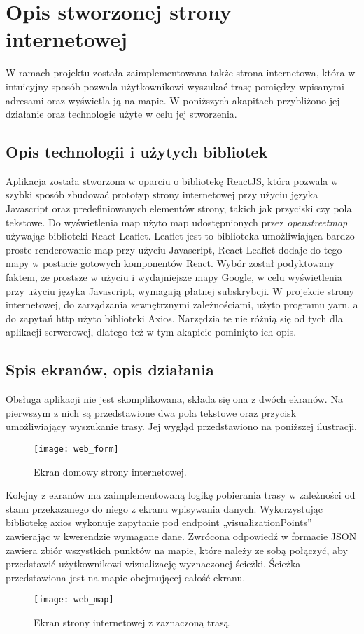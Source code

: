 \section{Opis stworzonej strony internetowej}

W ramach projektu została zaimplementowana także strona internetowa, która w intuicyjny sposób pozwala użytkownikowi wyszukać trasę pomiędzy wpisanymi adresami oraz wyświetla ją na mapie. W poniższych akapitach przybliżono jej działanie oraz technologie użyte w celu jej stworzenia.

\subsection{Opis technologii i użytych bibliotek}

Aplikacja została stworzona w oparciu o bibliotekę ReactJS, która pozwala w szybki sposób zbudować prototyp strony internetowej przy użyciu języka Javascript oraz predefiniowanych elementów strony, takich jak przyciski czy pola tekstowe. Do wyświetlenia map użyto map udostępnionych przez \textit{openstreetmap} używając biblioteki React Leaflet. Leaflet jest to biblioteka umożliwiająca bardzo proste renderowanie map przy użyciu Javascript, React Leaflet dodaje do tego mapy w postacie gotowych komponentów React. Wybór został podyktowany faktem, że prostsze w użyciu i wydajniejsze mapy Google, w celu wyświetlenia przy użyciu języka Javascript, wymagają płatnej subskrybcji.
W projekcie strony internetowej, do zarządzania zewnętrznymi zależnościami, użyto programu yarn, a do zapytań http użyto biblioteki Axios. Narzędzia te nie różnią się od tych dla aplikacji serwerowej, dlatego też w tym akapicie pominięto ich opis.

\subsection{Spis ekranów, opis działania}

Obsługa aplikacji nie jest skomplikowana, składa się ona z dwóch ekranów. Na pierwszym z nich są przedstawione dwa pola tekstowe oraz przycisk umożliwiający wyszukanie trasy. Jej wygląd przedstawiono na poniższej ilustracji.

\begin{figure}[H]
\centering
\texttt{[image: web\_form]}
\caption{Ekran domowy strony internetowej.}
\end{figure}

Kolejny z ekranów ma zaimplementowaną logikę pobierania trasy w zależności od stanu przekazanego do niego z ekranu wpisywania danych. Wykorzystując bibliotekę axios wykonuje zapytanie pod endpoint „visualizationPoints” zawierając w kwerendzie wymagane dane. Zwrócona odpowiedź w formacie JSON zawiera zbiór wszystkich punktów na mapie, które należy ze sobą połączyć, aby przedstawić użytkownikowi wizualizację wyznaczonej ścieżki. Ścieżka przedstawiona jest na mapie obejmującej całość ekranu.

\begin{figure}[H]
\centering
\texttt{[image: web\_map]}
\caption{Ekran strony internetowej z zaznaczoną trasą.}
\end{figure}
